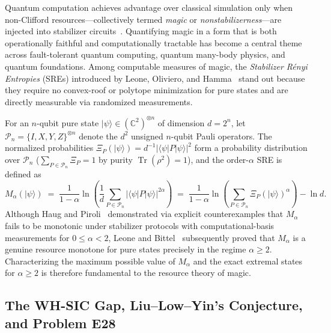 \documentclass[11pt,a4paper]{article}
\theoremstyle{plain}
\theoremstyle{definition}
\theoremstyle{remark}
\newcommand{\C}{\mathbb{C}}
\newcommand{\ket}[1]{\lvert #1 \rangle}
\newcommand{\expval}[2]{\langle #1 \vert #2 \vert #1 \rangle}
\newcommand{\Tr}{\operatorname{Tr}}
\newcommand{\Pauli}{\mathcal{P}}
\begin{document}
Quantum computation achieves advantage over classical simulation only when non-Clifford resources---collectively termed \emph{magic} or \emph{nonstabilizerness}---are injected into stabilizer circuits~\cite{BravyiKitaev2005,Veitch2014}. Quantifying magic in a form that is both operationally faithful and computationally tractable has become a central theme across fault-tolerant quantum computing, quantum many-body physics, and quantum foundations. Among computable measures of magic, the \emph{Stabilizer R\'enyi Entropies} (SREs) introduced by Leone, Oliviero, and Hamma~\cite{LeoneOlivieroHamma2022} stand out because they require no convex-roof or polytope minimization for pure states and are directly measurable via randomized measurements.

For an $n$-qubit pure state $\ket{\psi} \in (\C^2)^{\otimes n}$ of dimension $d = 2^n$, let $\Pauli_n = \{I, X, Y, Z\}^{\otimes n}$ denote the $d^2$ unsigned $n$-qubit Pauli operators. The normalized probabilities $\Xi_P(\ket{\psi}) = d^{-1} \lvert\expval{\psi}{P}\rvert^2$ form a probability distribution over $\Pauli_n$ ($\sum_{P\in\Pauli_n} \Xi_P = 1$ by purity $\Tr(\rho^2)=1$), and the order-$\alpha$ SRE is defined as
\begin{equation}
  \label{eq:sre-def}
  M_\alpha(\ket{\psi})
  \;=\; \frac{1}{1-\alpha} \ln\!\left(\frac{1}{d} \sum_{P \in \Pauli_n} \lvert\expval{\psi}{P}\rvert^{2\alpha}\right)
  \;=\; \frac{1}{1-\alpha} \ln\!\left(\sum_{P \in \Pauli_n} \Xi_P(\ket{\psi})^\alpha\right) - \ln d.
\end{equation}
Although Haug and Piroli~\cite{HaugPiroli2023} demonstrated via explicit counterexamples that $M_\alpha$ fails to be monotonic under stabilizer protocols with computational-basis measurements for $0 \le \alpha < 2$, Leone and Bittel~\cite{LeoneBittel2024} subsequently proved that $M_\alpha$ is a genuine resource monotone for pure states precisely in the regime $\alpha \ge 2$. Characterizing the maximum possible value of $M_\alpha$ and the exact extremal states for $\alpha \ge 2$ is therefore fundamental to the resource theory of magic.

\subsection{The WH-SIC Gap, Liu--Low--Yin's Conjecture, and Problem E28}
\end{document}
